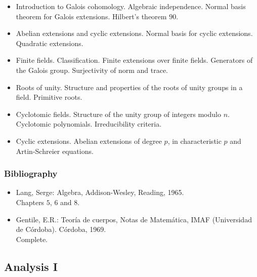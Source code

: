 \documentclass[spanish]{article}
\begin{document}
\begin{itemize}
  \item
Introduction to Galois cohomology. Algebraic independence. Normal basis theorem for
Galois extensions. Hilbert's theorem $90$.

  \item
Abelian extensions and cyclic extensions. Normal basis for cyclic extensions.
Quadratic extensions.

  \item
Finite fields. Classification. Finite extensions over finite fields. Generators
of the Galois group. Surjectivity of norm and trace.

  \item
Roots of unity. Structure and properties of the roots of unity groups in a field.
Primitive roots.

  \item
Cyclotomic fields. Structure of the unity group of integers modulo $n$. Cyclotomic
polynomials. Irreducibility criteria.

  \item
Cyclic extensions. Abelian extensions of degree $p$, in characteristic $p$ and
Artin-Schreier equations.

\end{itemize}


\subsubsection{Bibliography}
\begin{itemize}
  \item
Lang, Serge: Algebra, Addison-Wesley, Reading, 1965.\\
Chapters $5$, $6$ and $8$.

  \item
Gentile, E.R.: Teoría de cuerpos, Notas de Matemática, IMAF (Universidad de Córdoba). Córdoba, 1969.\\
Complete.
\end{itemize}


\hrulefill%

\subsection{Analysis I}
\end{document}
